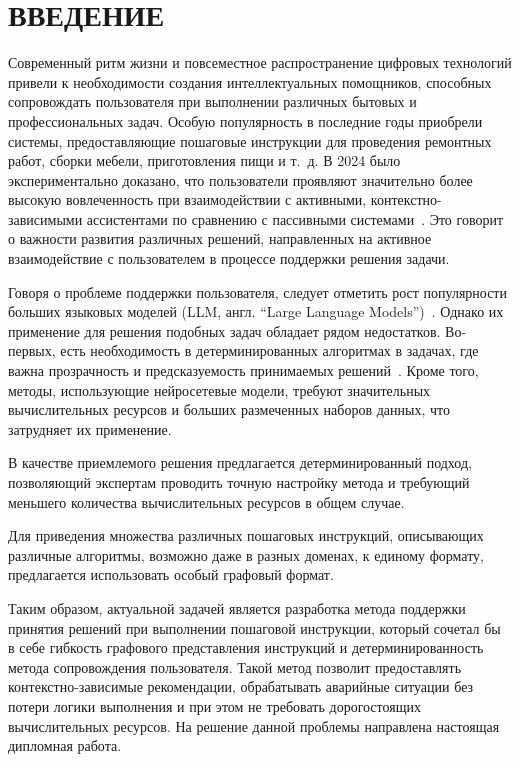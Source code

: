 \chapter*{ВВЕДЕНИЕ}

Современный ритм жизни и повсеместное распространение цифровых технологий привели к необходимости создания интеллектуальных помощников, способных сопровождать пользователя при выполнении различных бытовых и профессиональных задач.
Особую популярность в последние годы приобрели системы, предоставляющие пошаговые инструкции для проведения ремонтных работ, сборки мебели, приготовления пищи и т.~д.
В 2024 было экспериментально доказано, что пользователи проявляют значительно более высокую вовлеченность при взаимодействии с активными, контекстно-зависимыми ассистентами по сравнению с пассивными системами~\cite{frummet2024cooking}.
Это говорит о важности развития различных решений, направленных на активное взаимодействие с пользователем в процессе поддержки решения задачи.

Говоря о проблеме поддержки пользователя, следует отметить рост популярности больших языковых моделей (LLM, англ. ``Large Language Models'')~\cite{straitsresearch2025llm}.
Однако их применение для решения подобных задач обладает рядом недостатков.
Во-первых, есть необходимость в детерминированных алгоритмах в задачах, где важна прозрачность и предсказуемость принимаемых решений~\cite{rudin2019stop}. 
Кроме того, методы, использующие нейросетевые модели, требуют значительных вычислительных ресурсов и больших размеченных наборов данных, что затрудняет их применение.

В качестве приемлемого решения предлагается детерминированный подход, позволяющий экспертам проводить точную настройку метода и требующий меньшего количества вычислительных ресурсов в общем случае.

Для приведения множества различных пошаговых инструкций, описывающих различные алгоритмы, возможно даже в разных доменах, к единому формату, предлагается использовать особый графовый формат.

Таким образом, актуальной задачей является разработка метода поддержки принятия решений при выполнении пошаговой инструкции, который сочетал бы в себе гибкость графового представления инструкций и детерминированность метода сопровождения пользователя.
Такой метод позволит предоставлять контекстно-зависимые рекомендации, обрабатывать аварийные ситуации без потери логики выполнения и при этом не требовать дорогостоящих вычислительных ресурсов.
На решение данной проблемы направлена настоящая дипломная работа.

